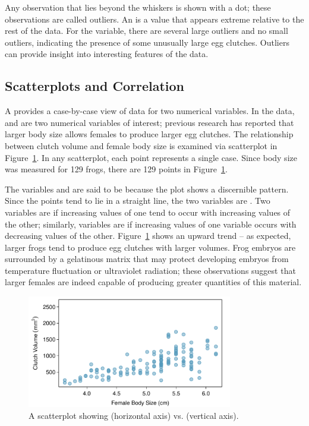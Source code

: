 Any observation that lies beyond the whiskers is shown with a dot; these observations are called outliers. An  is a value that appears extreme relative to the rest of the data. For the  variable, there are several large outliers and no small outliers, indicating the presence of some unusually large egg clutches. Outliers can provide insight into interesting features of the data. 

\subsection{Scatterplots and Correlation}
\label{scatterPlots}

A  provides a case-by-case view of data for two numerical variables. In the  data,  and  are two numerical variables of interest; previous research has reported that larger body size allows females to produce larger egg clutches. The relationship between clutch volume and female body size is examined via scatterplot in Figure~\ref{frogClutchVolBodySize}. In any scatterplot, each point represents a single case. Since body size was measured for 129 frogs, there are 129 points in Figure~\ref{frogClutchVolBodySize}.

The variables  and  are said to be  because the plot shows a discernible pattern. Since the points tend to lie in a straight line, the two variables are . Two variables are  if increasing values of one tend to occur with increasing values of the other; similarly, variables are  if increasing values of one variable occurs with decreasing values of the other. Figure~\ref{frogClutchVolBodySize} shows an upward trend -- as expected, larger frogs tend to produce egg clutches with larger volumes. Frog embryos are surrounded by a gelatinous matrix that may protect developing embryos from temperature fluctuation or ultraviolet radiation; these observations suggest that larger females are indeed capable of producing greater quantities of this material.

\begin{figure}
\centering
\includegraphics[width=0.8\textwidth]
{ch_intro_to_data_oi_biostat/figures/frogClutchVolBodySize/frogClutchVolBodySize}
\caption{A scatterplot showing  (horizontal axis) vs.  (vertical axis). }
\label{frogClutchVolBodySize}
\end{figure}

